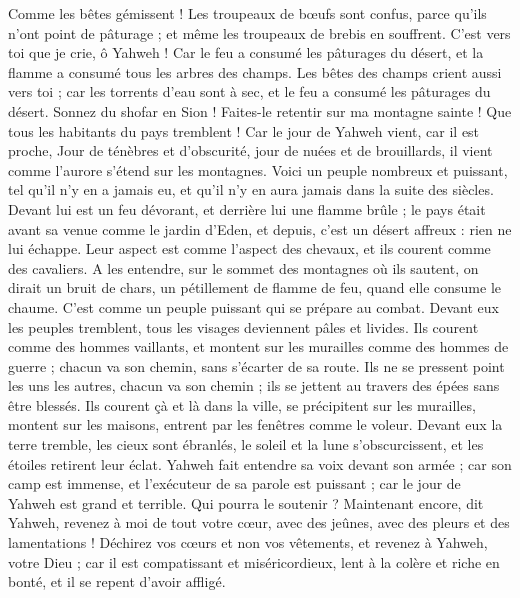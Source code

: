 \begin{multicols}{2}
Comme les bêtes gémissent ! Les troupeaux de bœufs sont confus, parce qu'ils n'ont point de pâturage ; et même les troupeaux de brebis en souffrent.
C’est vers toi que je crie, ô Yahweh ! Car le feu a consumé les pâturages du désert, et la flamme a consumé tous les arbres des champs.
Les bêtes des champs crient aussi vers toi ; car les torrents d’eau sont à sec, et le feu a consumé les pâturages du désert.
\VerseOne{}Sonnez du shofar en Sion ! Faites-le retentir sur ma montagne sainte ! Que tous les habitants du pays tremblent ! Car le jour de Yahweh vient, car il est proche,
Jour de ténèbres et d'obscurité, jour de nuées et de brouillards, il vient comme l'aurore s'étend sur les montagnes. Voici un peuple nombreux et puissant, tel qu’il n’y en a jamais eu, et qu’il n’y en aura jamais dans la suite des siècles.
Devant lui est un feu dévorant, et derrière lui une flamme brûle ; le pays était avant sa venue comme le jardin d’Eden, et depuis, c’est un désert affreux : rien ne lui échappe.
Leur aspect est comme l’aspect des chevaux, et ils courent comme des cavaliers.
A les entendre, sur le sommet des montagnes où ils sautent, on dirait un bruit de chars, un pétillement de flamme de feu, quand elle consume le chaume. C’est comme un peuple puissant qui se prépare au combat.
Devant eux les peuples tremblent, tous les visages deviennent pâles et livides.
Ils courent comme des hommes vaillants, et montent sur les murailles comme des hommes de guerre ; chacun va son chemin, sans s’écarter de sa route.
Ils ne se pressent point les uns les autres, chacun va son chemin ; ils se jettent au travers des épées sans être blessés.
Ils courent çà et là dans la ville, se précipitent sur les murailles, montent sur les maisons, entrent par les fenêtres comme le voleur.
Devant eux la terre tremble, les cieux sont ébranlés, le soleil et la lune s’obscurcissent, et les étoiles retirent leur éclat.
Yahweh fait entendre sa voix devant son armée ; car son camp est immense, et l'exécuteur de sa parole est puissant ; car le jour de Yahweh est grand et terrible. Qui pourra le soutenir ?
Maintenant encore, dit Yahweh, revenez à moi de tout votre cœur, avec des jeûnes, avec des pleurs et des lamentations !
Déchirez vos cœurs et non vos vêtements, et revenez à Yahweh, votre Dieu ; car il est compatissant et miséricordieux, lent à la colère et riche en bonté, et il se repent d’avoir affligé.

\end{multicols}
